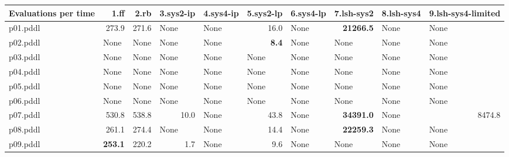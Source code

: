\documentclass{article}
\begin{document}
\begin{tabular}{@{}lrrrrrrrrr@{}}
Evaluations per time & 1.ff & 2.rb & 3.sys2-ip & 4.sys4-ip & 5.sys2-lp & 6.sys4-lp & 7.lsh-sys2 & 8.lsh-sys4 & 9.lsh-sys4-limited \\
\midrule
p01.pddl & 273.9 & 271.6 & \multicolumn{1}{|l|}{None} & \multicolumn{1}{|l|}{None} & 16.0 & \multicolumn{1}{|l|}{None} & \textbf{21266.5} & \multicolumn{1}{|l|}{None} & \multicolumn{1}{|l|}{None} \\
p02.pddl & \multicolumn{1}{|l|}{None} & \multicolumn{1}{|l|}{None} & \multicolumn{1}{|l|}{None} & \multicolumn{1}{|l|}{None} & \textbf{8.4} & \multicolumn{1}{|l|}{None} & \multicolumn{1}{|l|}{None} & \multicolumn{1}{|l|}{None} & \multicolumn{1}{|l|}{None} \\
p03.pddl & \multicolumn{1}{|l|}{None} & \multicolumn{1}{|l|}{None} & \multicolumn{1}{|l|}{None} & \multicolumn{1}{|l|}{None} & \multicolumn{1}{|l|}{None} & \multicolumn{1}{|l|}{None} & \multicolumn{1}{|l|}{None} & \multicolumn{1}{|l|}{None} & \multicolumn{1}{|l|}{None} \\
p04.pddl & \multicolumn{1}{|l|}{None} & \multicolumn{1}{|l|}{None} & \multicolumn{1}{|l|}{None} & \multicolumn{1}{|l|}{None} & \multicolumn{1}{|l|}{None} & \multicolumn{1}{|l|}{None} & \multicolumn{1}{|l|}{None} & \multicolumn{1}{|l|}{None} & \multicolumn{1}{|l|}{None} \\
p05.pddl & \multicolumn{1}{|l|}{None} & \multicolumn{1}{|l|}{None} & \multicolumn{1}{|l|}{None} & \multicolumn{1}{|l|}{None} & \multicolumn{1}{|l|}{None} & \multicolumn{1}{|l|}{None} & \multicolumn{1}{|l|}{None} & \multicolumn{1}{|l|}{None} & \multicolumn{1}{|l|}{None} \\
p06.pddl & \multicolumn{1}{|l|}{None} & \multicolumn{1}{|l|}{None} & \multicolumn{1}{|l|}{None} & \multicolumn{1}{|l|}{None} & \multicolumn{1}{|l|}{None} & \multicolumn{1}{|l|}{None} & \multicolumn{1}{|l|}{None} & \multicolumn{1}{|l|}{None} & \multicolumn{1}{|l|}{None} \\
p07.pddl & 530.8 & 538.8 & 10.0 & \multicolumn{1}{|l|}{None} & 43.8 & \multicolumn{1}{|l|}{None} & \textbf{34391.0} & \multicolumn{1}{|l|}{None} & 8474.8 \\
p08.pddl & 261.1 & 274.4 & \multicolumn{1}{|l|}{None} & \multicolumn{1}{|l|}{None} & 14.4 & \multicolumn{1}{|l|}{None} & \textbf{22259.3} & \multicolumn{1}{|l|}{None} & \multicolumn{1}{|l|}{None} \\
p09.pddl & \textbf{253.1} & 220.2 & 1.7 & \multicolumn{1}{|l|}{None} & 9.6 & \multicolumn{1}{|l|}{None} & \multicolumn{1}{|l|}{None} & \multicolumn{1}{|l|}{None} & \multicolumn{1}{|l|}{None} \\

\end{tabular}
\end{document}
